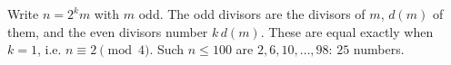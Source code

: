 Write $n=2^km$ with $m$ odd. The odd divisors are the divisors of $m$, $d(m)$ of them, and the even divisors number $k\,d(m)$. These are equal exactly when $k=1$, i.e. $n\equiv2\pmod4$. Such $n\le100$ are $2,6,10,\dots,98$: $\boxed{25}$ numbers.

